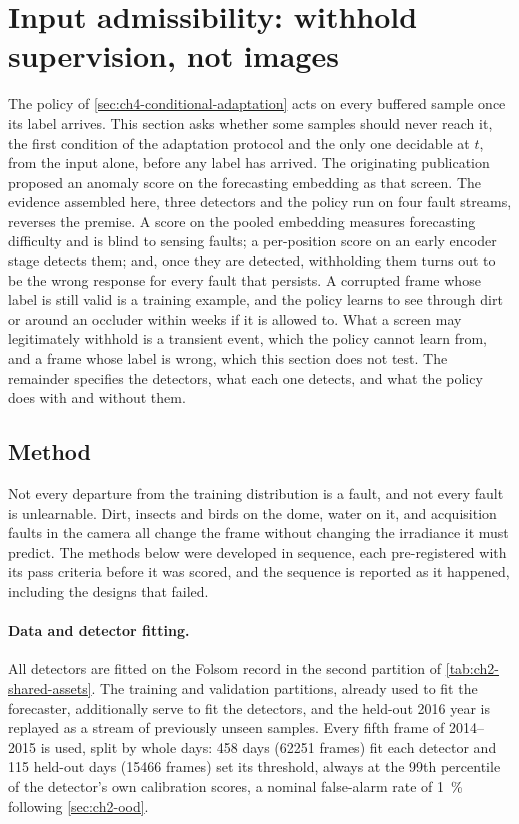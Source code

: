 \section{Input admissibility: withhold supervision, not images}
\label{sec:ch4-admissibility}
The policy of \cref{sec:ch4-conditional-adaptation} acts on every buffered sample once its label arrives. This section asks whether some samples should never reach it, the first condition of the adaptation protocol and the only one decidable at $t$, from the input alone, before any label has arrived. The originating publication~\cite{Piechocki2025:i63677} proposed an anomaly score on the forecasting embedding as that screen. The evidence assembled here, three detectors and the policy run on four fault streams, reverses the premise. A score on the pooled embedding measures forecasting difficulty and is blind to sensing faults; a per-position score on an early encoder stage detects them; and, once they are detected, withholding them turns out to be the wrong response for every fault that persists. A corrupted frame whose label is still valid is a training example, and the policy learns to see through dirt or around an occluder within weeks if it is allowed to. What a screen may legitimately withhold is a transient event, which the policy cannot learn from, and a frame whose label is wrong, which this section does not test. The remainder specifies the detectors, what each one detects, and what the policy does with and without them.

\subsection{Method}
\label{sec:ch4-admissibility-method}
Not every departure from the training distribution is a fault, and not every fault is unlearnable. Dirt, insects and birds on the dome, water on it, and acquisition faults in the camera all change the frame without changing the irradiance it must predict. The methods below were developed in sequence, each pre-registered with its pass criteria before it was scored, and the sequence is reported as it happened, including the designs that failed.

\paragraph{Data and detector fitting.} All detectors are fitted on the Folsom record in the second partition of \cref{tab:ch2-shared-assets}. The training and validation partitions, already used to fit the forecaster, additionally serve to fit the detectors, and the held-out 2016 year is replayed as a stream of previously unseen samples. Every fifth frame of 2014--2015 is used, split by whole days: 458 days (\num{62251} frames) fit each detector and 115 held-out days (\num{15466} frames) set its threshold, always at the 99th percentile of the detector's own calibration scores, a nominal false-alarm rate of \SI{1}{\percent} following \cref{sec:ch2-ood}.

